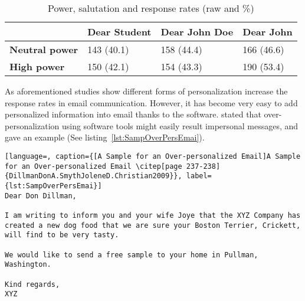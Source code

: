 \begin{table}[!ht]
\begin{center}
	\caption[Power, salutation and response rates (raw and \%)]{Power, salutation and response rates (raw and \%) \citep{Joinson2007}} \label{tab:pow_sal_res}
    \begin{tabular}{ p{3cm} p{3cm}  p{3cm}  p{3cm} }
	\hline
	& \textbf{Dear Student} & \textbf{Dear John Doe} & \textbf{Dear John} \\ \hline
	\textbf{Neutral power} & 143 (40.1) & 158 (44.4) & 166 (46.6) \\
	\textbf{High power} & 150 (42.1) & 154 (43.3) & 190 (53.4) \\ \hline
    \end{tabular}
\end{center}
\end{table}

As aforementioned studies show different forms of personalization increase the response rates in email communication. However, it has become very easy to add personalized information into email thanks to the software. \citet[page 237-238]{DillmanDonA.SmythJoleneD.Christian2009} stated that over-personalization using software tools might easily result impersonal messages, and gave an example (See listing~\ref{lst:SampOverPersEmai}).
\vspace{1cm}

\clearpage


\begin{lstlisting}[language=, caption={[A Sample for an Over-personalized Email]A Sample for an Over-personalized Email \citep[page 237-238]{DillmanDonA.SmythJoleneD.Christian2009}}, label={lst:SampOverPersEmai}]
Dear Don Dillman,

I am writing to inform you and your wife Joye that the XYZ Company has created a new dog food that we are sure your Boston Terrier, Crickett, will find to be very tasty. 

We would like to send a free sample to your home in Pullman, Washington.

Kind regards,
XYZ
\end{lstlisting}

